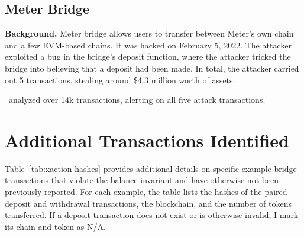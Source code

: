 \subsection{Meter Bridge}
\textbf{Background.} Meter bridge allows users to transfer between Meter's own chain and a few EVM-based chains. It was hacked on February 5, 2022. The attacker exploited a bug in the bridge's deposit function, where the attacker tricked the bridge into believing that a deposit had been made. In total, the attacker carried out 5 transactions, stealing around \$4.3 million worth of assets.

 \offlinetool~analyzed over 14k transactions, alerting on all five attack transactions.




\section{Additional Transactions Identified}

Table~\ref{tab:xaction-hashes} provides additional details on specific
example bridge transactions that violate the balance invariant and
have otherwise not been previously reported.  For each example, the
table lists the hashes of the paired deposit and withdrawal
transactions, the blockchain, and the number of tokens transferred. If
a deposit transaction does not exist or is otherwise invalid, I mark
its chain and token as N/A.
